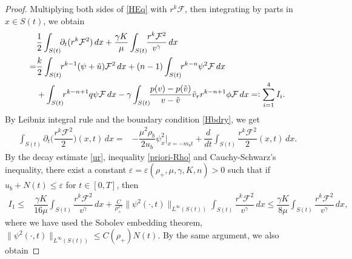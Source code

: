 \documentclass[a4paper,12pt,draft]{article}
\theoremstyle{remark}
\def\d{\partial}
\def\ut{\tilde{u}}
\def\vt{\tilde{v}}
\def\ep{\varepsilon}
\def\mF{\mathcal{F}}
\begin{document}
\begin{proof}
    Multiplying both sides of \eqref{HEq} with $r^{k}\mF$, then integrating by parts in $x\in S(t)$, we obtain
    \begin{align}
        &\frac{1}{2}\int_{S(t)}\!\! \d_t(r^k \mF^2)\, dx + \dfrac{\gamma K}{\mu} \int_{S(t)}\!\! \dfrac{r^k \mF^2}{v^{\gamma}}\, dx \nonumber\\
        =& \frac{k}{2}\int_{S(t)}\!\! r^{k-1}(\psi+\ut)\mF^2 \,dx + (n-1) \int_{S(t)}\!\! r^{k-n}\psi^2 \mF \, dx\nonumber\\
        & + \int_{S(t)}\!\!  r^{k-n+1} q \psi \mF \, dx - \gamma \int_{S(t)}\!\!  \dfrac{p(v)-p(\vt)}{v-\vt}\vt_r r^{k-n+1}\phi \mF \, dx =\vcentcolon \sum_{i=1}^4 I_i. \label{rmH2}
    \end{align}
    By Leibniz integral rule and the boundary condition \eqref{Hbdry}, we get
    \begin{align}
        \int_{S(t)} \d_t\big(\dfrac{r^k \mF^2}{2}\big)(x,t) \, dx %
        =& -\dfrac{\mu^2 \rho_b}{2 u_b} \psi_x^2 \Big\vert_{x=-m_b t} + \dfrac{d}{dt} \int_{S(t)}\!\! \dfrac{r^k \mF^2}{2}(x,t) \, dx. \label{leibH2}
    \end{align}
    By the decay estimate \eqref{ur}, inequality \eqref{priori-Rho} and Cauchy-Schwarz's inequality, there exist a constant $\ep=\ep(\rho_+,\mu,\gamma,K,n)>0$ such that if $u_b + N(t) \le \ep$ for $t\in[0,T]$, then
    \begin{align*}
        I_1 %
        \le& \dfrac{\gamma K}{16 \mu} \int_{S(t)}\!\! \dfrac{r^k \mF^2}{v^{\gamma}}\,dx  + \frac{C}{\rho_{+}^{2\gamma}} \|\psi^2(\cdot,t)\|_{L^{\infty}(S(t))}  \int_{S(t)}\!\! \dfrac{r^{k} \mF^2}{v^{\gamma}}\, dx \le \dfrac{\gamma K}{8 \mu} \int_{S(t)}\!\! \dfrac{r^k \mF^2}{v^{\gamma}}\,dx,
        \end{align*}
        where we
        have
        used the Sobolev embedding theorem, $\|\psi^2(\cdot,t)\|_{L^{\infty}(S(t))} \le C(\rho_{+}) N(t)$. By the same argument, we also obtain

\end{proof}
\end{document}
